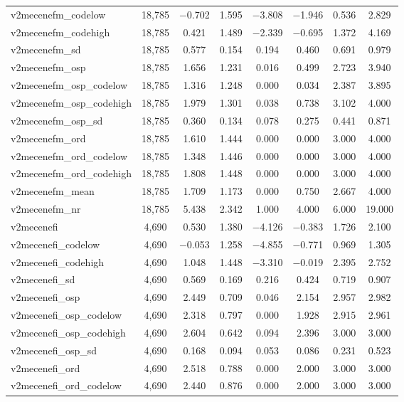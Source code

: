 \begin{table}[!htbp]
\begin{tabular}{@{\extracolsep{5pt}}lccccccc}
v2mecenefm\_codelow & 18,785 & $-$0.702 & 1.595 & $-$3.808 & $-$1.946 & 0.536 & 2.829 \\ 
v2mecenefm\_codehigh & 18,785 & 0.421 & 1.489 & $-$2.339 & $-$0.695 & 1.372 & 4.169 \\ 
v2mecenefm\_sd & 18,785 & 0.577 & 0.154 & 0.194 & 0.460 & 0.691 & 0.979 \\ 
v2mecenefm\_osp & 18,785 & 1.656 & 1.231 & 0.016 & 0.499 & 2.723 & 3.940 \\ 
v2mecenefm\_osp\_codelow & 18,785 & 1.316 & 1.248 & 0.000 & 0.034 & 2.387 & 3.895 \\ 
v2mecenefm\_osp\_codehigh & 18,785 & 1.979 & 1.301 & 0.038 & 0.738 & 3.102 & 4.000 \\ 
v2mecenefm\_osp\_sd & 18,785 & 0.360 & 0.134 & 0.078 & 0.275 & 0.441 & 0.871 \\ 
v2mecenefm\_ord & 18,785 & 1.610 & 1.444 & 0.000 & 0.000 & 3.000 & 4.000 \\ 
v2mecenefm\_ord\_codelow & 18,785 & 1.348 & 1.446 & 0.000 & 0.000 & 3.000 & 4.000 \\ 
v2mecenefm\_ord\_codehigh & 18,785 & 1.808 & 1.448 & 0.000 & 0.000 & 3.000 & 4.000 \\ 
v2mecenefm\_mean & 18,785 & 1.709 & 1.173 & 0.000 & 0.750 & 2.667 & 4.000 \\ 
v2mecenefm\_nr & 18,785 & 5.438 & 2.342 & 1.000 & 4.000 & 6.000 & 19.000 \\ 
v2mecenefi & 4,690 & 0.530 & 1.380 & $-$4.126 & $-$0.383 & 1.726 & 2.100 \\ 
v2mecenefi\_codelow & 4,690 & $-$0.053 & 1.258 & $-$4.855 & $-$0.771 & 0.969 & 1.305 \\ 
v2mecenefi\_codehigh & 4,690 & 1.048 & 1.448 & $-$3.310 & $-$0.019 & 2.395 & 2.752 \\ 
v2mecenefi\_sd & 4,690 & 0.569 & 0.169 & 0.216 & 0.424 & 0.719 & 0.907 \\ 
v2mecenefi\_osp & 4,690 & 2.449 & 0.709 & 0.046 & 2.154 & 2.957 & 2.982 \\ 
v2mecenefi\_osp\_codelow & 4,690 & 2.318 & 0.797 & 0.000 & 1.928 & 2.915 & 2.961 \\ 
v2mecenefi\_osp\_codehigh & 4,690 & 2.604 & 0.642 & 0.094 & 2.396 & 3.000 & 3.000 \\ 
v2mecenefi\_osp\_sd & 4,690 & 0.168 & 0.094 & 0.053 & 0.086 & 0.231 & 0.523 \\ 
v2mecenefi\_ord & 4,690 & 2.518 & 0.788 & 0.000 & 2.000 & 3.000 & 3.000 \\ 
v2mecenefi\_ord\_codelow & 4,690 & 2.440 & 0.876 & 0.000 & 2.000 & 3.000 & 3.000 \\ 

\end{tabular}
\end{table}
